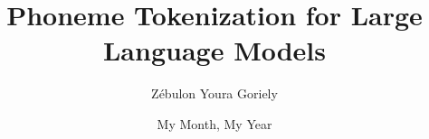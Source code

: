 
\title{Phoneme Tokenization for Large Language Models}

\author{Z\'ebulon Youra Goriely}



\submissiondate{\today}


\date{My Month, My Year}

